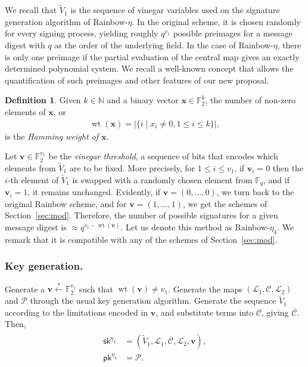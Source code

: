 \documentclass[english]{ufsc-thesis-rn46-2019/ufsc-thesis-rn46-2019}
\DeclareMathOperator*{\wt}{wt}
\newcommand{\random}{\overset{\mathsf{r}}{\gets}}
\theoremstyle{definition}
\newtheorem{definition}[theorem]{Definition}
\begin{document}
We recall that $\widetilde{V}_{1}$ is the sequence of vinegar variables used on
the signature generation algorithm of Rainbow-$\eta$. In the original scheme,
it is chosen randomly for every signing process, yielding roughly $q^{v_{1}}$
possible preimages for a message digest with $q$ as the order of the underlying
field. In the case of Rainbow-$\eta$, there is only one preimage if the partial
evaluation of the central map gives an exactly determined polynomial system. We
recall a well-known concept that allows the quantification of such preimages
and other features of our new proposal.

\begin{definition}
  Given $k \in \mathbb{N}$ and a binary vector
  $\mathbf{x} \in \mathbb{F}_{2}^{k}$, the number of non-zero elements of
  $\mathbf{x}$, or
  \begin{align}
    \wt(\mathbf{x}) = |\{ i \mid x_{i} \neq 0, 1 \leq i \leq k \}|,
  \end{align}
  is the \emph{Hamming weight of $\mathbf{x}$}.
\end{definition}

Let $\mathbf{v} \in \mathbb{F}_{2}^{v_{1}}$ be the \emph{vinegar threshold}, a
sequence of bits that encodes which elements from $\widetilde{V}_{1}$ are to be
fixed. More precisely, for $1 \leq i \leq v_{1}$, if $\mathbf{v}_{i} = 0$ then
the $i$-th element of $\widetilde{V}_{1}$ is swapped with a randomly chosen
element from $\mathbb{F}_{q}$, and if $\mathbf{v}_{i} = 1$, it remains
unchanged. Evidently, if $\mathbf{v} = (0, \dots, 0)$, we turn back to the
original Rainbow scheme, and for $\mathbf{v} = (1, \dots, 1)$, we get the
schemes of Section~\ref{sec:mod}. Therefore, the number of possible signatures
for a given message digest is $\approx q^{v_{1} - \wt(\mathbf{v})}$. Let us
denote this method as Rainbow-$\eta_{4}$. We remark that it is compatible with
any of the schemes of Section~\ref{sec:mod}.

\subsubsection{Key generation.}

Generate a $\mathbf{v} \random{} \mathbb{F}_{2}^{v_{1}}$ such that
$\wt(\mathbf{v}) \neq v_{1}$. Generate the maps
$(\mathcal{L}_{1}, \mathcal{C}, \mathcal{L}_{2})$ and $\mathcal{P}$ through the
usual key generation algorithm. Generate the sequence $\widetilde{V}_{1}$
according to the limitations encoded in $\mathbf{v}$, and substitute terms into
$\mathcal{C}$, giving $\overline{\mathcal{C}}$. Then,
\begin{align}
  \begin{split}
    \mathsf{sk}^{\eta_{4}}
      &= (\widetilde{V}_{1}, \mathcal{L}_{1}, \overline{\mathcal{C}},
        \mathcal{L}_{2}, \mathbf{v}), \\
    \mathsf{pk}^{\eta_{4}}
      &= \mathcal{P}.
  \end{split}
\end{align}
\end{document}
